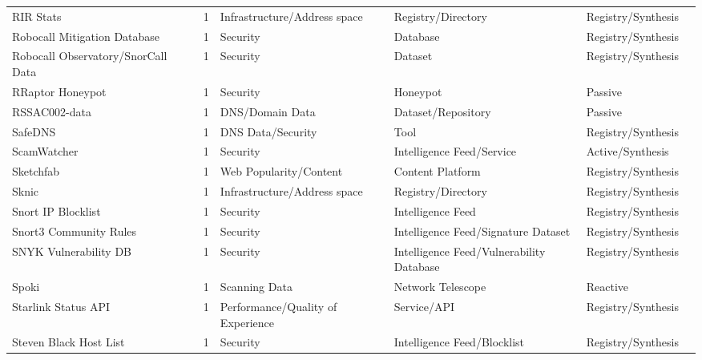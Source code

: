 \begin{table}[h!]
\begin{tabular}{lllllll}
RIR Stats & \cite{rir_stats} & 1 & Infrastructure/Address space & Registry/Directory & Registry/Synthesis & \cite{10.1145/3517745.3561454} \\
Robocall Mitigation Database & \cite{robocalldatabase} & 1 & Security & Database & Registry/Synthesis & \cite{10.1145/3777912.3839819} \\
Robocall Observatory/SnorCall Data & \cite{3620237.3620262} & 1 & Security & Dataset & Registry/Synthesis & \cite{10.1145/3777912.3839819} \\
RRaptor Honeypot & \cite{rraptor} & 1 & Security & Honeypot & Passive & \cite{10.1145/3777912.3839819} \\
RSSAC002-data & \cite{rssac} & 1 & DNS/Domain Data & Dataset/Repository & Passive & \cite{10.1007/978-3-030-98785-5_12} \\
SafeDNS & \cite{safedns} & 1 & DNS Data/Security & Tool & Registry/Synthesis & \cite{10.1145/3777912.3839806} \\
ScamWatcher & \cite{scamwatcher} & 1 & Security & Intelligence Feed/Service & Active/Synthesis & \cite{10.1145/3618257.3624822} \\
Sketchfab & \cite{sketchfab} & 1 & Web Popularity/Content & Content Platform & Registry/Synthesis & \cite{10.1145/3618257.3624833} \\
Sknic & \cite{sknic} & 1 & Infrastructure/Address space & Registry/Directory & Registry/Synthesis & \cite{10.1007/978-3-031-85960-1_5} \\
Snort IP Blocklist & \cite{snortip} & 1 & Security & Intelligence Feed & Registry/Synthesis & \cite{10.1007/978-3-030-72582-2_31} \\
Snort3 Community Rules & \cite{snortcomrules} & 1 & Security & Intelligence Feed/Signature Dataset & Registry/Synthesis & \cite{10.1007/978-3-031-56252-5_15} \\
SNYK Vulnerability DB & \cite{snyk} & 1 & Security & Intelligence Feed/Vulnerability Database & Registry/Synthesis & \cite{10.1145/3618257.3624804} \\
Spoki & \cite{spoki} & 1 & Scanning Data & Network Telescope & Reactive & \cite{10.1145/3777912.3839790} \\
Starlink Status API & \cite{dishy} & 1 & Performance/Quality of Experience & Service/API & Registry/Synthesis & \cite{10.1145/3517745.3561457} \\
Steven Black Host List & \cite{stevenblack} & 1 & Security & Intelligence Feed/Blocklist & Registry/Synthesis & \cite{10.1145/3618257.3624842} \\

\end{tabular}
\end{table}
